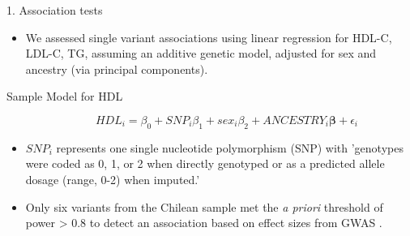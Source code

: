 \documentclass[pdf]{beamer}\usepackage[]{graphicx}\usepackage[]{color}
\begin{document}
\begin{frame}{1. Association tests}

\begin{itemize}
  \item We assessed single variant associations using linear regression for HDL-C, LDL-C, TG, assuming an additive genetic model, adjusted for sex and ancestry (via principal components).
\end{itemize}

\begin{description}
  \item[Sample Model for HDL] $$HDL_i = \beta_0 + SNP_i \beta_1 + sex_i \beta_2 + ANCESTRY_i \boldsymbol{\beta} + \epsilon_i$$
\end{description}

\begin{itemize}
  \item $SNP_i$ represents one single nucleotide polymorphism (SNP) with 'genotypes were coded as 0, 1, or 2 when directly genotyped or as a predicted allele dosage (range, 0-2) when imputed.' 
    
  \item Only six variants from the Chilean sample met the \textit{a priori} threshold of power > 0.8 to detect an association based on effect sizes from GWAS .
  \end{itemize}

\end{frame}

\end{document}
